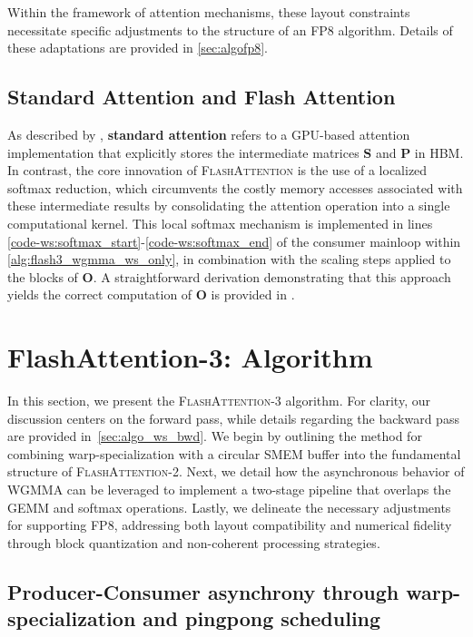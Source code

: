 Within the framework of attention mechanisms, these layout constraints necessitate specific adjustments to the structure of an FP8 algorithm. Details of these adaptations are provided in \cref{sec:algofp8}.

\subsection{Standard Attention and Flash Attention} As described by \citet{dao2022flashattention}, \textbf{standard attention} refers to a GPU-based attention implementation that explicitly stores the intermediate matrices $\mathbf{S}$ and $\mathbf{P}$ in HBM. In contrast, the core innovation of \textsc{FlashAttention} is the use of a localized softmax reduction, which circumvents the costly memory accesses associated with these intermediate results by consolidating the attention operation into a single computational kernel. This local softmax mechanism is implemented in lines \ref{code-ws:softmax_start}-\ref{code-ws:softmax_end} of the consumer mainloop within \cref{alg:flash3_wgmma_ws_only}, in combination with the scaling steps applied to the blocks of $\mathbf{O}$. A straightforward derivation demonstrating that this approach yields the correct computation of $\mathbf{O}$ is provided in \cite[\S 2.3.1]{dao2023flashattention2}.

\section{FlashAttention-3: Algorithm}
\label{sec:algo}

In this section, we present the \textsc{FlashAttention-3} algorithm. For clarity, our discussion centers on the forward pass, while details regarding the backward pass are provided in~\cref{sec:algo_ws_bwd}. We begin by outlining the method for combining warp-specialization with a circular SMEM buffer into the fundamental structure of \textsc{FlashAttention-2}. Next, we detail how the asynchronous behavior of WGMMA can be leveraged to implement a two-stage pipeline that overlaps the GEMM and softmax operations. Lastly, we delineate the necessary adjustments for supporting FP8, addressing both layout compatibility and numerical fidelity through block quantization and non-coherent processing strategies.

\subsection{Producer-Consumer asynchrony through warp-specialization and pingpong scheduling}
\label{sec:algo_ws}

